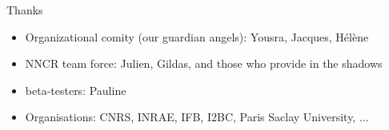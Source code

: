 \begin{frame}{Thanks}
\begin{itemize}
    \item Organizational comity (our guardian angels): Yousra, Jacques, Hélène
    \item NNCR team force: Julien, Gildas, and those who provide in the shadows
    \item beta-testers: Pauline
    \item Organisations: CNRS, INRAE, IFB, I2BC, Paris Saclay University, ...
\end{itemize}
\end{frame}

